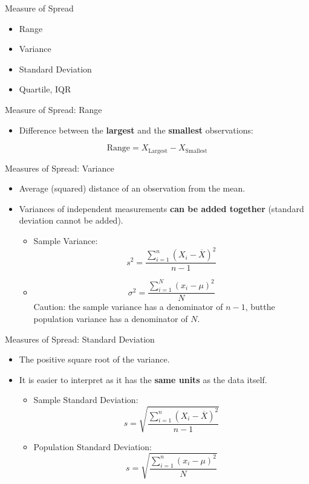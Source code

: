 \documentclass[ignorenonframetext,]{beamer}
\providecommand{\tightlist}{%
  \setlength{\itemsep}{0pt}\setlength{\parskip}{0pt}}
\begin{document}
\begin{frame}{Measure of Spread}

\begin{itemize}
\item
  Range
\item
  Variance
\item
  Standard Deviation
\item
  Quartile, IQR
\end{itemize}

\end{frame}

\begin{frame}{Measure of Spread: Range}

\begin{itemize}
\tightlist
\item
  Difference between the \textbf{largest} and the \textbf{smallest}
  observations:
\end{itemize}

\[\text{Range}=X_{\text{Largest}}-X_{\text{Smallest}}\]

\end{frame}

\begin{frame}{Measures of Spread: Variance}

\begin{itemize}
\item
  Average (squared) distance of an observation from the mean.
\item
  Variances of independent measurements \textbf{can be added together}
  (standard deviation cannot be added).

  \begin{itemize}
  \tightlist
  \item
    Sample Variance:
    \[s^2=\frac{\sum^n_{i=1}(X_i-\overline{X})^2}{n-1}\]
  \item
    \[\sigma^2=\frac{\sum^N_{i=1}(x_i-\mu)^2}{N}\] Caution: the sample
    variance has a denominator of \(n-1\), butthe population variance
    has a denominator of \(N\).
  \end{itemize}
\end{itemize}

\end{frame}

\begin{frame}{Measures of Spread: Standard Deviation}

\begin{itemize}
\item
  The positive square root of the variance.
\item
  It is easier to interpret as it has the \textbf{same units} as the
  data itself.

  \begin{itemize}
  \item
    Sample Standard Deviation:
    \[ s=\sqrt{\frac{\sum^n_{i=1}(X_i-\overline{X})^2}{n-1}} \]
  \item
    Population Standard Deviation:
    \[ s=\sqrt{\frac{\sum^n_{i=1}(x_i-\mu)^2}{N}} \]
  \end{itemize}
\end{itemize}

\end{frame}
\end{document}
